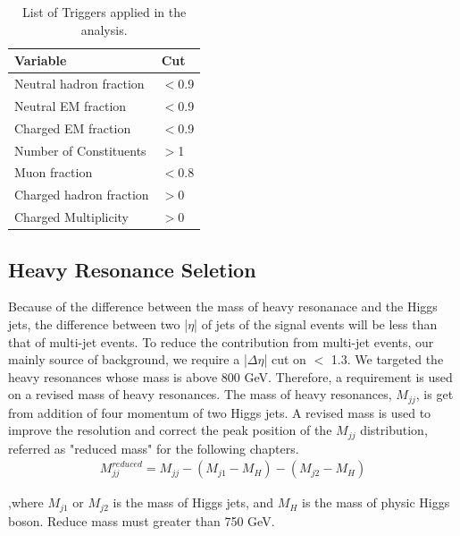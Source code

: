 \begin{table}[h!]
  \begin{center}
    \begin{tabular}{ll}
    Variable & Cut \\
    \hline
    Neutral hadron fraction & $<$0.9 \\
    Neutral EM fraction & $<$0.9 \\
    Charged EM fraction & $<$0.9 \\
    Number of Constituents & $>$1 \\
    Muon fraction & $<$0.8 \\
    Charged hadron fraction & $>$0 \\
    Charged Multiplicity & $>$0 \\
	\hline
    \end{tabular}
  \end{center}

  \caption{List of Triggers applied in the analysis.}
  \end{table}

\subsection{Heavy Resonance Seletion} 
Because of the difference between the mass of heavy resonanace and the Higgs jets, the difference between two |$\eta $| of jets of the signal events will be less than that of multi-jet events. To reduce the contribution from multi-jet events, our mainly source of background, we require a |$\Delta \eta $| cut on $<$ 1.3. 
We targeted the heavy resonances whose mass is above 800 GeV. Therefore, a requirement is used on a revised mass of heavy resonances. The mass of heavy resonances, $M_{jj}$, is get from addition of four momentum of two Higgs jets. A revised mass is used to improve the resolution and correct the peak position of the $M_{jj}$ distribution, referred as "reduced mass" for the following chapters.
\begin{equation} \label{eq4}
\begin{split}
M^{reduced}_{jj} = M_{jj} - (M_{j1} - M_{H} ) - (M_{j2} - M_{H} )
\end{split}
\end{equation}

,where $M_{j1}$ or $M_{j2}$ is the mass of Higgs jets, and $M_{H}$ is the mass of physic Higgs boson. Reduce mass must greater than 750 GeV. 

